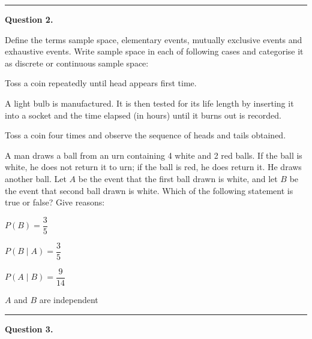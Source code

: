 \documentclass[11pt,a4paper]{article}
\begin{document}
\medskip\rule{\linewidth}{0.2pt}\medskip




\noindent   \textbf{Question 2.}

\begin{parts}
  \item Define the terms sample space, elementary events, mutually exclusive events and exhaustive events. Write sample space in each of following cases and categorise it as discrete or continuous sample space:
  
\begin{parts}
    \item Toss a coin repeatedly until head appears first time.
    \item A light bulb is manufactured. It is then tested for its life length by inserting it into a socket and the time elapsed (in hours) until it burns out is recorded.
    \item Toss a coin four times and observe the sequence of heads and tails obtained.
  \end{parts}

  \item A man draws a ball from an urn containing 4 white and 2 red balls. If the ball is white, he does not return it to urn; if the ball is red, he does return it. He draws another ball. Let $A$ be the event that the first ball drawn is white, and let $B$ be the event that second ball drawn is white. Which of the following statement is true or false? Give reasons:
  
\begin{parts}
    \item $P(B) = \dfrac{3}{5}$
    \item $P(B \mid A) = \dfrac{3}{5}$
    \item $P(A \mid B) = \dfrac{9}{14}$
    \item $A$ and $B$ are independent
  \end{parts}
\end{parts}

\medskip\rule{\linewidth}{0.2pt}\medskip




\noindent   \textbf{Question 3.}
\end{document}
